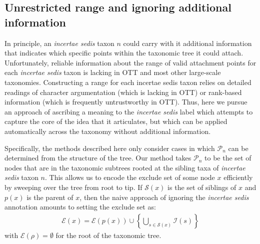 \documentclass[english]{article}
\begin{document}


\subsection{Unrestricted range and ignoring additional information}
In principle, an \emph{incertae sedis} taxon $n$ could carry with it additional
    information that indicates which specific points within the taxonomic tree
    it could attach.
Unfortunately, reliable information about the range of valid attachment points
for each \emph{incertae sedis} taxon is lacking in OTT and most other large-scale
taxonomies.
Constructing a range for each incertae sedis taxon relies on detailed
readings of character argumentation (which is lacking in OTT) or rank-based
information (which is frequently untrustworthy in OTT). Thus, here we pursue
an approach of ascribing a meaning to the \emph{incertae sedis} label which
attempts to capture the core of the idea that it articulates, but which can be
applied automatically across the taxonomy without additional information.


Specifically, the methods described here only consider cases in which 
    $\mathcal{P}_n$ can be determined from the structure of the tree.
Our method takes $\mathcal{P}_n$ to be the set of nodes that
    are in the taxonomic subtrees rooted at the sibling taxa of \emph{incertae sedis} taxon $n$.
This allows us to encode the exclude set of some node $x$ efficiently by sweeping
    over the tree from root to tip.
If $\mathcal{S}(x)$ is the set of siblings of $x$ and $p(x)$ is the parent of $x$, then
the naive approach of ignoring the \emph{incertae sedis}  annotation amounts to setting
    the exclude set as:
\begin{align}
    \mathcal{E}(x) = \mathcal{E}(p(x)) \cup \left\{ \bigcup_{s\in \mathcal{S}(x)} \mathcal{I}(s) \right\}
    \label{eq:exsetformonea-traditional}
\end{align}
with $\mathcal{E}(\rho) = \emptyset$ for the root of the taxonomic tree.
\end{document}
